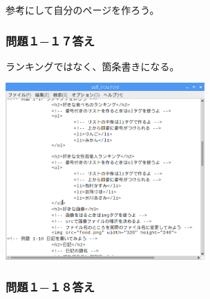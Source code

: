 \documentclass[a4paper,12pt]{jarticle}
\begin{document}
参考にして自分のページを作ろう。

\subsubsection{\bfseries
問題１−１７答え}

ランキングではなく、箇条書きになる。

\centering
\includegraphics[width=7.622cm,height=6.8cm]{textbook-img236.png}
\flushleft

\bigskip

\subsubsection{\bfseries
問題１−１８答え}
\end{document}
